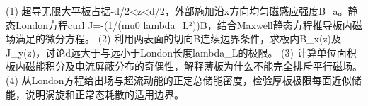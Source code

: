 (1) 超导无限大平板占据-d/2<z<d/2，外部施加沿x方向均匀磁感应强度B_a。静态London方程curl J=-(1/(mu0 lambda_L²))B，结合Maxwell静态方程推导板内磁场满足的微分方程。
(2) 利用两表面的切向B连续边界条件，求板内B_x(z)及J_y(z)，讨论d远大于与远小于London长度lambda_L的极限。
(3) 计算单位面积板内磁能积分及电流屏蔽分布的奇偶性，解释薄板为什么不能完全排斥平行磁场。
(4) 从London方程给出场与超流动能的正定总储能密度，检验厚板极限每面近似储能，说明涡旋和正常态耗散的适用边界。

